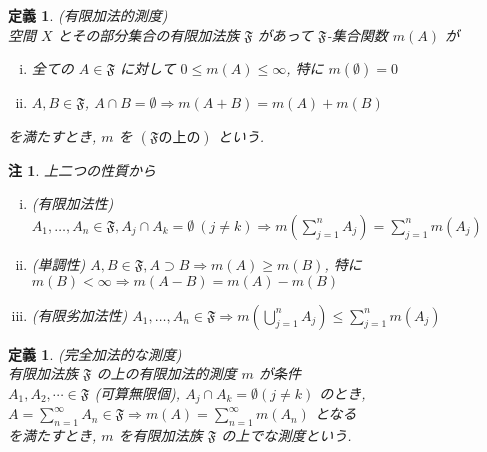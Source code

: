 \documentclass[dvipdfmx]{jsreport}
\newtheorem{defi}[theo]{定義}
\newtheorem{rema}[theo]{注}
\begin{document}
\begin{defi}
    (有限加法的測度) \\
    空間 $X$ とその部分集合の有限加法族 $\mathfrak{F}$ があって $\mathfrak{F}$-集合関数 $m(A)$ が
    \begin{enumerate}[(i)]
        \item 全ての $A \in \mathfrak{F}$ に対して $0 \leq m(A) \leq \infty$, 特に $m(\emptyset) = 0$
        \item $A, B \in \mathfrak{F}$, $A \cap B = \emptyset \Rightarrow m(A + B) = m(A) + m(B)$ 
    \end{enumerate}
    を満たすとき, $m$ を $(\mathfrak{F}の上の)$ という. 
\end{defi}
\begin{rema}
    上二つの性質から
    \begin{enumerate}[(i)]
        \item (有限加法性) $\displaystyle A_1, \dots, A_n \in \mathfrak{F}, A_j \cap A_k = \emptyset \ (j \neq k) \Rightarrow m\left(\sum_{j = 1}^n A_j\right) = \sum_{j = 1}^n m(A_j)$
        \item (単調性) $A, B \in \mathfrak{F}, A \supset B \Rightarrow m(A) \geq m(B)$, 特に $m(B) < \infty \Rightarrow m(A - B) = m(A) - m(B)$
        \item (有限劣加法性) $\displaystyle A_1, \dots, A_n \in \mathfrak{F} \Rightarrow m\left( \bigcup_{j = 1}^n A_j \right) \leq \sum_{j = 1}^n m(A_j)$
    \end{enumerate}
\end{rema}

\begin{defi}
    (完全加法的な測度) \\
    有限加法族 $\mathfrak{F}$ の上の有限加法的測度 $m$ が条件 \\
    $A_1, A_2, \cdots \in \mathfrak{F}$ (可算無限個), $A_j \cap A_k = \emptyset (j \neq k)$ のとき, $A = \sum_{n = 1}^\infty A_n \in \mathfrak{F} \Rightarrow m(A) = \sum_{n = 1}^\infty m(A_n)$ となる \\
    を満たすとき, $m$ を有限加法族 $\mathfrak{F}$ の上でな測度という. 
\end{defi}
\end{document}

